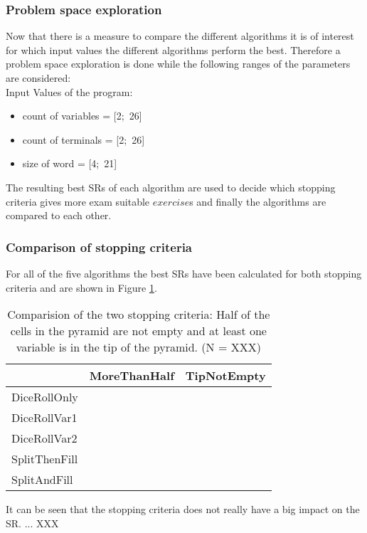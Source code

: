 \subsubsection{Problem space exploration}
Now that there is a measure to compare the different algorithms it is of interest for which input values the different algorithms perform the best. Therefore a problem space exploration is done while the following ranges of the parameters are considered:\\

\noindent Input Values of the program:
\begin{itemize}[noitemsep,nolistsep]
	\item count of variables = [2;~26]
	\item count of terminals = [2;~26]
	\item size of word = [4;~21]
\end{itemize}
\vspace{0.6cm}
\noindent The resulting best SRs of each algorithm are used to decide which stopping criteria  gives more exam suitable $exercise$s and finally the algorithms are compared to each other. \\

\subsubsection{Comparison of stopping criteria}
For all of the five algorithms the best SRs have been calculated for both stopping criteria and are shown in Figure \ref{comparisionStoppingCriteria}.

\begin{table}[h]
	\centering
		\begin{tabular}{l|l|l|}
			\cline{2-3}
			& MoreThanHalf & TipNotEmpty \\ \hline
			\multicolumn{1}{|l|}{DiceRollOnly}  &              &             \\ \hline
			\multicolumn{1}{|l|}{DiceRollVar1}  &              &             \\ \hline
			\multicolumn{1}{|l|}{DiceRollVar2}  &              &             \\ \hline
			\multicolumn{1}{|l|}{SplitThenFill} &              &             \\ \hline
			\multicolumn{1}{|l|}{SplitAndFill}  &              &             \\ \hline
		\end{tabular}
	\caption{Comparision of the two stopping criteria: Half of the cells in the pyramid are not empty and at least one variable is in the tip of the pyramid. (N = XXX)}
	\label{comparisionStoppingCriteria}
\end{table}
\noindent It can be seen that the stopping criteria does not really have a big impact on the SR. ... XXX




